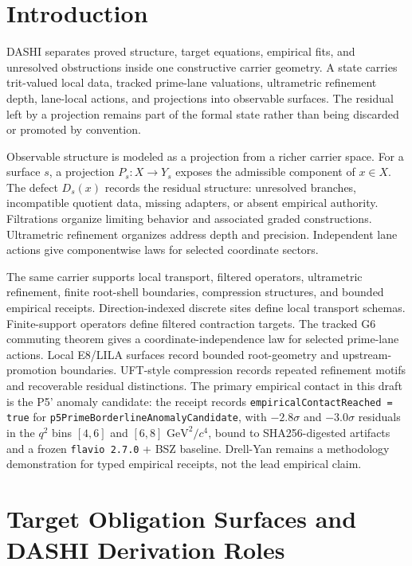 \documentclass[11pt]{article}
\theoremstyle{definition}
\theoremstyle{plain}
\theoremstyle{remark}
\begin{document}
\section{Introduction}

DASHI separates proved structure, target equations, empirical fits, and
unresolved obstructions inside one constructive carrier geometry. A state
carries trit-valued local data, tracked prime-lane valuations, ultrametric refinement
depth, lane-local actions, and projections into observable surfaces. The
residual left by a projection remains part of the formal state rather than
being discarded or promoted by convention.

Observable structure is modeled as a projection from a richer carrier space.
For a surface \(s\), a projection \(P_s:X\to Y_s\) exposes the admissible
component of \(x\in X\). The defect \(D_s(x)\) records the residual structure:
unresolved branches, incompatible quotient data, missing adapters, or absent
empirical authority. Filtrations organize limiting behavior and associated
graded constructions. Ultrametric refinement organizes address depth and
precision. Independent lane actions give componentwise laws for selected
coordinate sectors.

The same carrier supports local transport, filtered operators, ultrametric
refinement, finite root-shell boundaries, compression structures, and bounded
empirical receipts. Direction-indexed discrete sites define local transport
schemas. Finite-support operators define filtered contraction targets. The
tracked G6 commuting theorem gives a coordinate-independence law for selected
prime-lane actions. Local E8/LILA surfaces record bounded root-geometry and
upstream-promotion boundaries. UFT-style compression records repeated
refinement motifs and recoverable residual distinctions. The primary empirical
contact in this draft is the P5' anomaly candidate: the receipt records
\texttt{empiricalContactReached = true} for
\texttt{p5PrimeBorderlineAnomalyCandidate}, with \(-2.8\sigma\) and
\(-3.0\sigma\) residuals in the \(q^2\) bins \([4,6]\) and \([6,8]\)
\(\mathrm{GeV}^2/c^4\), bound to SHA256-digested artifacts and a frozen
\texttt{flavio 2.7.0} + BSZ baseline. Drell-Yan remains a methodology
demonstration for typed empirical receipts, not the lead empirical claim.

\section*{Target Obligation Surfaces and DASHI Derivation Roles}
\end{document}
